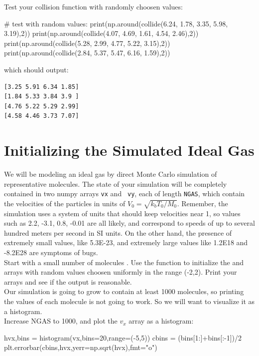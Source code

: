 {\plot Test your collision function with randomly choosen values:
\begin{python}
# test with random values:
print(np.around(collide(6.24, 1.78, 3.35, 5.98, 3.19),2))
print(np.around(collide(4.07, 4.69, 1.61, 4.54, 2.46),2))
print(np.around(collide(5.28, 2.99, 4.77, 5.22, 3.15),2))
print(np.around(collide(2.84, 5.37, 5.47, 6.16, 1.59),2))
\end{python}
which should output:
\begin{verbatim}
[3.25 5.91 6.34 1.85]
[1.84 5.33 3.84 3.9 ]
[4.76 5.22 5.29 2.99]
[4.58 4.46 3.73 7.07]
\end{verbatim}

\section{Initializing the Simulated Ideal Gas}

We will be modeling an ideal gas by direct Monte Carlo simulation of
 representative molecules.  The state of your simulation
will be completely contained in two numpy arrays {\tt vx} and {\tt
  vy}, each of length {\tt NGAS}, which contain the velocities of the
particles in units of $V_0 = \sqrt{k_b T_0 / M_0}$.  Remember, the
simulation uses a system of units that should keep velocities near 1,
so values such as 2.2, -3.1, 0.8, -0.01 are all likely, and correspond
to speeds of up to several hundred meters per second in SI units.  On
the other hand, the presence of extremely small values, like 5.3E-23,
and extremely large values like 1.2E18 and -8.2E28 are symptoms of
bugs.\\

\plot Start with a small number of molecules .  Use the
 function to initialize the  and
 arrays with random values choosen uniformly in the range
(-2,2).  Print your arrays and see if the output is reasonable.\\

Our simulation is going to grow to contain at least 1000 molecules, so
printing the values of each molecule is not going to work.  So we will want to visualize it as a histogram.\\

\plot Increase NGAS to 1000, and plot the $v_x$ array as a histogram:
\begin{python}
hvx,bins = histogram(vx,bins=20,range=(-5,5))
cbins = (bins[1:]+bins[:-1])/2
plt.errorbar(cbins,hvx,yerr=np.sqrt(hvx),fmt="o")
\end{python}
~\\ \vskip -0.5cm

}
